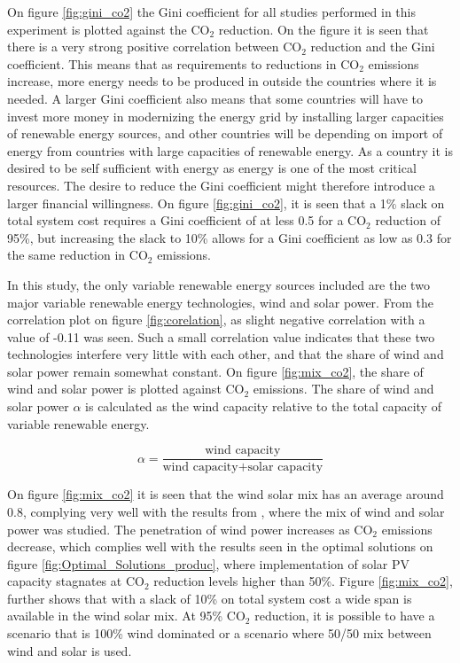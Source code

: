 On figure \ref{fig:gini_co2} the Gini coefficient for all studies performed in this experiment is plotted against the $\text{CO}_2$ reduction. On the figure it is seen that there is a very strong positive correlation between $\text{CO}_2$ reduction and the Gini coefficient. This means that as requirements to reductions in $\text{CO}_2$ emissions increase, more energy needs to be produced in outside the countries where it is needed. A larger Gini coefficient also means that some countries will have to invest more money in modernizing the energy grid by installing larger capacities of renewable energy sources, and other countries will be depending on import of energy from countries with large capacities of renewable energy. As a country it is desired to be self sufficient with energy as energy is one of the most critical resources. The desire to reduce the Gini coefficient might therefore introduce a larger financial willingness. On figure \ref{fig:gini_co2}, it is seen that a 1\% slack on total system cost requires a Gini coefficient of at less 0.5 for a $\text{CO}_2$ reduction of 95\%, but increasing the slack to 10\% allows for a Gini coefficient as low as 0.3 for the same reduction in $\text{CO}_2$ emissions.  

In this study, the only variable renewable energy sources included are the two major variable renewable energy technologies, wind and solar power. From the correlation plot on figure \ref{fig:corelation}, as slight negative correlation with a value of -0.11 was seen. Such a small correlation value indicates that these two technologies interfere very little with each other, and that the share of wind and solar power remain somewhat constant. On figure \ref{fig:mix_co2}, the share of wind and solar power is plotted against $\text{CO}_2$ emissions. The share of wind and solar power $\alpha$ is calculated as the wind capacity relative to the total capacity of variable renewable energy. 

\begin{equation}
	\alpha =  \frac{\text{wind capacity}}{\text{wind capacity}+\text{solar capacity}}
\end{equation}

On figure \ref{fig:mix_co2} it is seen that the wind solar mix has an average around 0.8, complying very well with the results from \cite{rasmussen2011a}, where the mix of wind and solar power was studied. The penetration of wind power increases as $\text{CO}_2$ emissions decrease, which complies well with the results seen in the optimal solutions on figure \ref{fig:Optimal_Solutions_produc}, where implementation of solar PV capacity stagnates at $\text{CO}_2$ reduction levels higher than 50\%. Figure \ref{fig:mix_co2}, further shows that with a slack of 10\% on total system cost a wide span is available in the wind solar mix. At 95\% $\text{CO}_2$ reduction, it is possible to have a scenario that is 100\% wind dominated or a scenario where 50/50 mix between wind and solar is used. 

